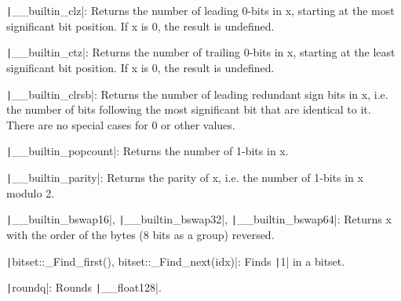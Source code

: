 \begin{compactenum}
\item \texttt|__builtin_clz|: Returns the number of leading 0-bits in x, starting at the most significant bit position. If x is 0, the result is undefined.
\item \texttt|__builtin_ctz|: Returns the number of trailing 0-bits in x, starting at the least significant bit position. If x is 0, the result is undefined.
\item \texttt|__builtin_clrsb|: Returns the number of leading redundant sign bits in x, i.e. the number of bits following the most significant bit that are identical to it. There are no special cases for 0 or other values.
\item \texttt|__builtin_popcount|: Returns the number of 1-bits in x.
\item \texttt|__builtin_parity|: Returns the parity of x, i.e. the number of 1-bits in x modulo 2.
\item \texttt|__builtin_bswap16|, \texttt|__builtin_bswap32|, \texttt|__builtin_bswap64|: Returns x with the order of the bytes (8 bits as a group) reversed.
\item \texttt|bitset::_Find_first(), bitset::_Find_next(idx)|: Finds \texttt|1| in a bitset.
\item \texttt|roundq|: Rounds \texttt|__float128|.
\end{compactenum}

